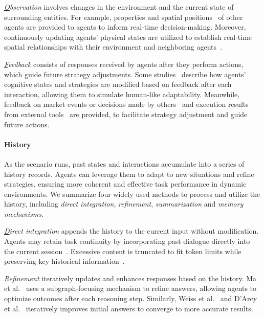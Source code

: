 \textit{{\ul Observation}} involves changes in the environment and the current state of surrounding entities. For example, properties and spatial positions~\cite{lin2024swiftsage,tan2024true,chen2024s,chen2024scalable} of other agents are provided to agents to inform real-time decision-making. Moreover, continuously updating agents' physical states are utilized to establish real-time spatial relationships with their environment and neighboring agents~\cite{zhu2023ghost,chen2024scalable,tan2024true,zhang2024towards}.

\textit{{\ul Feedback}} consists of responses received by agents after they perform actions, which guide future strategy adjustments. Some studies~\cite{talebirad2023multi,chen2024s,sreedhar2024simulating} describe how agents’ cognitive states and strategies are modified based on feedback after each interaction, allowing them to simulate human-like adaptability. Meanwhile, feedback on market events or decisions made by others~\cite{li2023tradinggpt,sreedhar2024simulating} and execution results from external tools~\cite{qian2024chatdev,hong2023metagpt,wu2023autogen} are provided, to facilitate strategy adjustment and guide future actions.

\paragraph{History}

As the scenario runs, past states and interactions accumulate into a series of history records.
Agents can leverage them to adapt to new situations and refine strategies, ensuring more coherent and effective task performance in dynamic environments.
We summarize four widely used methods to process and utilize the history, including \textit{direct integration}, \textit{refinement}, \textit{summarization} and \textit{memory mechanisms}.

\textit{{\ul Direct integration}} appends the history to the current input without modification. Agents may retain task continuity by incorporating past dialogue directly into the current session~\cite{du2023improving,liang2023encouraging,wu2023large,wu2023autogen}. Excessive content is truncated to fit token limits while preserving key historical information~\cite{chen2024scalable,xie2023openagents}.

\textit{{\ul Refinement}} iteratively updates and enhances responses based on the history. Ma et al.~\cite{ma2024debate} uses a subgraph-focusing mechanism to refine answers, allowing agents to optimize outcomes after each reasoning step. Similarly, Weiss et al.~\cite{weissrethinking} and D'Arcy et al.~\cite{d2024marg} iteratively improves initial answers to converge to more accurate results.


